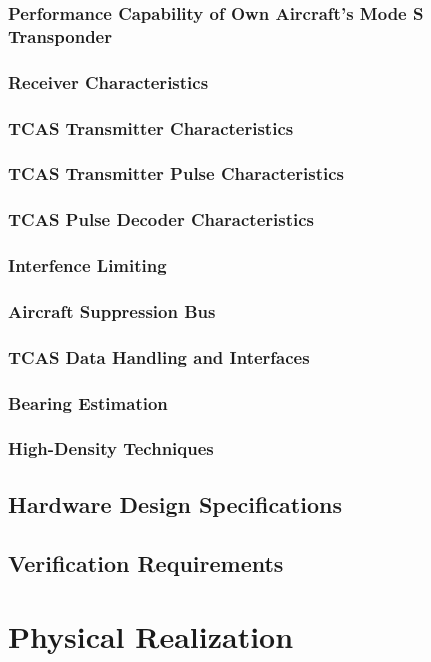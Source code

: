 \documentclass[12pt]{report}
\begin{document}
\subsection{Performance Capability of Own Aircraft's Mode S Transponder}
\subsection{Receiver Characteristics}
\subsection{TCAS Transmitter Characteristics}
\subsection{TCAS Transmitter Pulse Characteristics}
\subsection{TCAS Pulse Decoder Characteristics}
\subsection{Interfence Limiting}
\subsection{Aircraft Suppression Bus}
\subsection{TCAS Data Handling and Interfaces}
\subsection{Bearing Estimation}
\subsection{High-Density Techniques}
\section{Hardware Design Specifications}
\section{Verification Requirements}

\chapter{Physical Realization}
\end{document}
